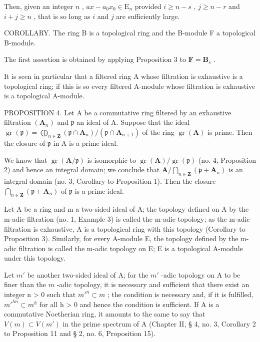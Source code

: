 Then, given an integer \(n\) , \(ax - a_0x_0 \in \mathrm{E}_n\) provided \(i \geqslant n - s\) , \(j \geqslant n - r\) and \(i + j \geqslant n\) , that is so long as \(i\) and \(j\) are sufficiently large.

COROLLARY. The ring B is a topological ring and the B-module F a topological B-module.

The first assertion is obtained by applying Proposition 3 to \(\mathbf{F} = \mathbf{B}_s\) .

It is seen in particular that a filtered ring A whose filtration is exhaustive is a topological ring; if this is so every filtered A-module whose filtration is exhaustive is a topological A-module.

PROPOSITION 4. Let A be a commutative ring filtered by an exhaustive filtration \((\mathbf{A}_n)\) and \(\mathfrak{p}\) an ideal of A. Suppose that the ideal \(\operatorname{gr}(\mathfrak{p}) = \bigoplus_{n \in \mathbf{Z}} (\mathfrak{p} \cap \mathbf{A}_n) / (\mathfrak{p} \cap \mathbf{A}_{n+1})\) of the ring \(\operatorname{gr}(\mathbf{A})\) is prime. Then the closure of \(\mathfrak{p}\) in A is a prime ideal.

We know that \(\operatorname{gr}(\mathbf{A} / \mathfrak{p})\) is isomorphic to \(\operatorname{gr}(\mathbf{A}) / \operatorname{gr}(\mathfrak{p})\) (no. 4, Proposition 2) and hence an integral domain; we conclude that \(\mathbf{A} / \bigcap_{n\in \mathbf{Z}}(\mathfrak{p} + \mathbf{A}_n)\) is an integral domain (no. 3, Corollary to Proposition 1). Then the closure \(\bigcap_{n\in \mathbf{Z}}(\mathfrak{p} + \mathbf{A}_n)\) of \(\mathfrak{p}\) is a prime ideal.

Let A be a ring and m a two-sided ideal of A; the topology defined on A by the m-adic filtration (no. 1, Example 3) is called the m-adic topology; as the m-adic filtration is exhaustive, A is a topological ring with this topology (Corollary to Proposition 3). Similarly, for every A-module E, the topology defined by the m-adic filtration is called the m-adic topology on E; E is a topological A-module under this topology.

Let \(m'\) be another two-sided ideal of A; for the \(m'\) -adic topology on A to be finer than the \(m\) -adic topology, it is necessary and sufficient that there exist an integer n \textgreater{} 0 such that \(m'^n \subset m\) ; the condition is necessary and, if it is fulfilled, \(m'^{hn} \subset m^h\) for all h \textgreater{} 0 and hence the condition is sufficient. If A is a commutative Noetherian ring, it amounts to the same to say that \(V(m) \subset V(m')\) in the prime spectrum of A (Chapter II, § 4, no. 3, Corollary 2 to Proposition 11 and § 2, no. 6, Proposition 15).

